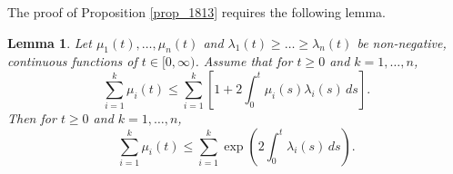 \documentclass[12pt,a4paper]{article}
\newtheorem{lemma}[theorem]{Lemma}
\theoremstyle{definition}
\begin{document}
The proof of Proposition \ref{prop_1813} requires the following lemma.

\begin{lemma} Let $\mu_1(t), \ldots, \mu_n(t)$ and $\lambda_1(t) \geq \ldots \geq \lambda_n(t)$ be non-negative, continuous functions of $t \in [0, \infty)$.
Assume that  for $t \geq 0$ and $k=1,\ldots,n$,
\begin{equation}\label{eq_stepmlljhbv_}
\sum_{i=1}^k \mu_i(t)
\leq \sum_{i=1}^k \left[ 1 + 2 \int_0^t \mu_i (s) \lambda_i (s) \, ds \right].
\end{equation}
Then for $t \geq 0$ and $k=1,\ldots,n$, 
\begin{equation}\label{eq_nvfinvkfvvvff}
\sum_{i=1}^k \mu_i (t) \leq \sum_{i=1}^k \exp \left( 2 \int_0^t \lambda_i (s) \, ds \right).
\end{equation}
\label{lem_2230}
\end{lemma}
\end{document}

